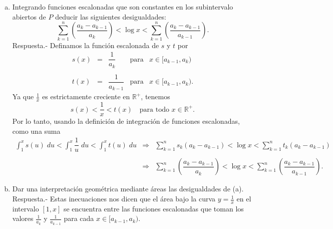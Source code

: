 \begin{enumerate}[\bfseries 1.]
\begin{enumerate}[a)]
	    \item Integrando funciones escalonadas que son constantes en los subintervalo abiertos de $P$ deducir las siguientes desigualdades:
	    $$\sum_{k=1}^n\left(\dfrac{a_k-a_{k-1}}{a_k}\right)<\log x<\sum_{k=1}^n \left(\dfrac{a_k-a_{k-1}}{a_{k-1}}\right).$$
		Respuesta.-\; Definamos la función escalonada de $s$ y $t$ por
		$$
		\begin{array}{rclcr}
		    s(x) &=& \dfrac{1}{a_k} & \mbox{para} & x\in [a_{k-1},a_k)\\\\
		    t(x) &=& \dfrac{1}{a_{k-1}} & \mbox{para} & x\in [a_{k-1},a_k).
		\end{array}
		$$
		Ya que $\frac{1}{x}$ es estrictamente creciente en $\mathbb{R}^+$, tenemos
		$$s(x)<\dfrac{1}{x}<t(x)\quad \mbox{para todo }x\in \mathbb{R}^+.$$
		Por lo tanto, usando la definición de integración de funciones escalonadas, como una suma
		$$
		\begin{array}{rcl}
		    \displaystyle\int_1^x s(u)\;du < \int_1^x \dfrac{1}{u}\; du < \int_1^x t(u)\; du &\Rightarrow& \displaystyle\sum_{k=1}^n s_k(a_k-a_{k-1})<\log x<\sum_{k=1}^n t_k(a_k-a_{k-1})\\\\
														 &\Rightarrow & \displaystyle\sum_{k=1}^n \left(\dfrac{a_k-a_{k-1}}{a_k}\right) < \log x < \sum_{k=1}^n \left(\dfrac{a_k-a_{k-1}}{a_{k-1}}\right).
		\end{array}
		$$
		\vspace{.5cm}

	    \item Dar una interpretación geométrica mediante áreas las desigualdades de (a).
		Respuesta.-\; Estas inecuaciones nos dicen que el área bajo la curva $y=\frac{1}{x}$ en el intervalo $[1,x]$ se encuentra entre las funciones escalonadas que toman los valores $\frac{1}{a_k}$ y $\frac{1}{a_{k-1}}$ para cada $x\in [a_{k-1},a_k)$.\\\\


\end{enumerate}
\end{enumerate}

